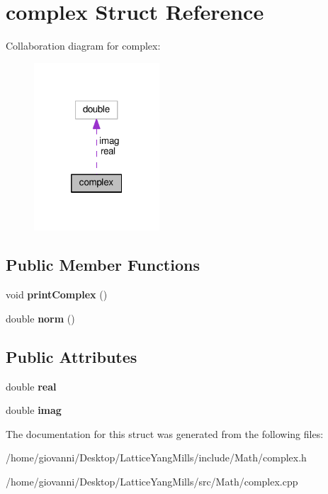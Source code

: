 \hypertarget{structcomplex}{}\section{complex Struct Reference}
\label{structcomplex}


Collaboration diagram for complex\+:\nopagebreak
\begin{figure}[H]
\begin{center}
\leavevmode
\includegraphics[width=133pt]{structcomplex__coll__graph}
\end{center}
\end{figure}
\subsection*{Public Member Functions}
\begin{DoxyCompactItemize}
\item 
void {\bfseries print\+Complex} ()\hypertarget{structcomplex_aed36e4f758691608576d96ef396cc436}{}\label{structcomplex_aed36e4f758691608576d96ef396cc436}

\item 
double {\bfseries norm} ()\hypertarget{structcomplex_a81dd00af9a4f56a86bd242b31cb1f8a4}{}\label{structcomplex_a81dd00af9a4f56a86bd242b31cb1f8a4}

\end{DoxyCompactItemize}
\subsection*{Public Attributes}
\begin{DoxyCompactItemize}
\item 
double {\bfseries real}\hypertarget{structcomplex_a754edcb8ad10b6b22f6f642089571432}{}\label{structcomplex_a754edcb8ad10b6b22f6f642089571432}

\item 
double {\bfseries imag}\hypertarget{structcomplex_a17e7cf8707199cba0dcd7360dd98aa9f}{}\label{structcomplex_a17e7cf8707199cba0dcd7360dd98aa9f}

\end{DoxyCompactItemize}


The documentation for this struct was generated from the following files\+:\begin{DoxyCompactItemize}
\item 
/home/giovanni/\+Desktop/\+Lattice\+Yang\+Mills/include/\+Math/complex.\+h\item 
/home/giovanni/\+Desktop/\+Lattice\+Yang\+Mills/src/\+Math/complex.\+cpp\end{DoxyCompactItemize}
